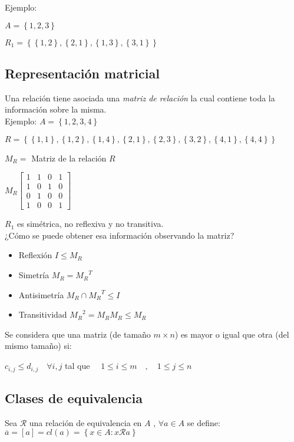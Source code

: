 \documentclass[a4paper, twoside]{article}
\begin{document}
Ejemplo:

$ A = \left\{1,2,3\right\}$

$R_1 = \left\{ \left\{ 1,2\right\} , \left\{ 2,1\right\} , \left\{ 1,3\right\} , \left\{ 3,1\right\} \right\}$

\subsection{Representación matricial}
Una relación tiene asociada una \emph{matriz de relación} la cual contiene toda la información sobre la misma.\\

Ejemplo:
$A = \left\{1,2,3,4\right\}$

$R = \left\{ \left\{ 1,1\right\} , \left\{ 1,2\right\} , \left\{ 1,4\right\} , \left\{ 2,1\right\} , \left\{ 2,3\right\} , \left\{ 3,2\right\} , \left\{ 4,1\right\} , \left\{ 4,4\right\} \right\}$

$M_R =$ Matriz de la relación $R$ 

$ M_R \left[\begin{array}{cccc}
1 & 1 & 0 & 1\\
1 & 0 & 1 & 0\\
0 & 1 & 0 & 0\\
1 & 0 & 0 & 1\end{array}\right]$

$R_1$ es simétrica, no reflexiva y no transitiva.\\

¿Cómo se puede obtener esa información observando la matriz?

\begin{itemize}
	\item{Reflexión} $I \leq M_R$
	\item{Simetría} $M_R = {M_R}^T$
	\item{Antisimetría} $M_R \cap {M_R}^T \leq I$
	\item{Transitividad} ${M_R}^2 = M_R M_R \leq M_R$
\end{itemize}

Se considera que una matriz (de tamaño $m \times n$) es mayor o igual que otra (del mismo tamaño) si:
\begin{center}
	$c_{i,j} \leq d_{i,j} \quad \forall i,j$ tal que $\quad 1 \leq i \leq m \quad , \quad 1 \leq j \leq n $
\end{center}

\subsection{Clases de equivalencia}
Sea $\mathcal{R}$ una relación de equivalencia en $A$ , $\forall a \in A $ se define:
$\overline{a} = \left[a\right] = cl(a) = \left\{x \in A: x\mathcal{R} a\right\}$\\
\end{document}
